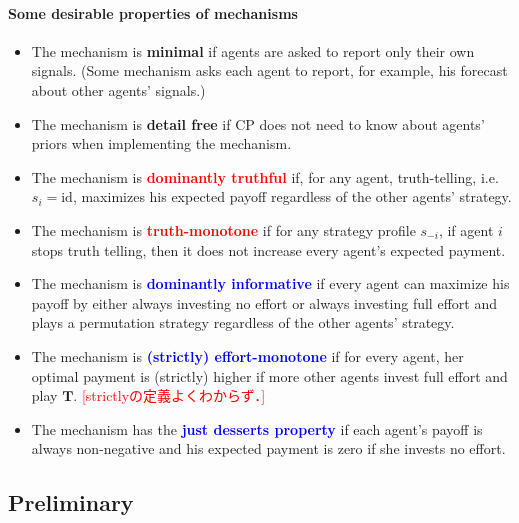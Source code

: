 \documentclass[11pt,a4paper,dvipdfmx]{article}
\theoremstyle{plain}
\newcommand{\1}{\mathbbm{1}}
\newcommand{\kcomment}[1]{{\textcolor{blue}{#1}}}
\newcommand{\ocomment}[1]{{\textcolor{red}{#1}}}
\begin{document}
\paragraph{Some desirable properties of mechanisms}
\begin{itemize}
	\item The mechanism is \textbf{minimal} if agents are asked to report only their own signals. (Some mechanism asks each agent to report, for example, his forecast about other agents' signals.)
	\item The mechanism is \textbf{detail free} if CP does not need to know about agents' priors when implementing the mechanism.
	\item The mechanism is \ocomment{\textbf{dominantly truthful}} if, for any agent, truth-telling, i.e. $s_i = \text{id}$, maximizes his expected payoff regardless of the other agents' strategy.
	\item The mechanism is \ocomment{\textbf{truth-monotone}} if for any strategy profile $s_{-i}$, if agent $i$ stops truth telling, then it does not increase every agent's expected payment.
	\item The mechanism is \kcomment{\textbf{dominantly informative}} if every agent can maximize his payoff by either always investing no effort or always investing full effort and plays a permutation strategy regardless of the other agents' strategy.
	\item The mechanism is \kcomment{\textbf{(strictly) effort-monotone}} if for every agent, her optimal payment is (strictly) higher if more other agents invest full effort and play $\mathbf{T}$. \ocomment{[strictlyの定義よくわからず．]}
	\item The mechanism has the \kcomment{\textbf{just desserts property}} if each agent's payoff is always non-negative and his expected payment is zero if she invests no effort.
\end{itemize}



\subsection{Preliminary}
\end{document}

